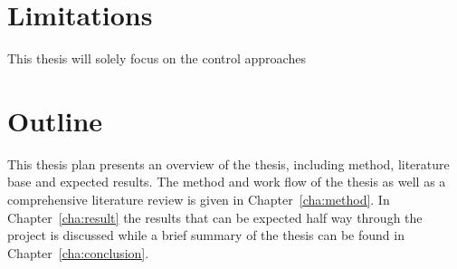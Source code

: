 \section{Limitations}
This thesis will solely focus on the control approaches

\section{Outline}
This thesis plan presents an overview of the thesis, including method, literature base and expected results. The method and work flow of the thesis as well as a comprehensive literature review is given in Chapter~\ref{cha:method}. In Chapter~\ref{cha:result} the results that can be expected half way through the project is discussed while a brief summary of the thesis can be found in Chapter~\ref{cha:conclusion}.
